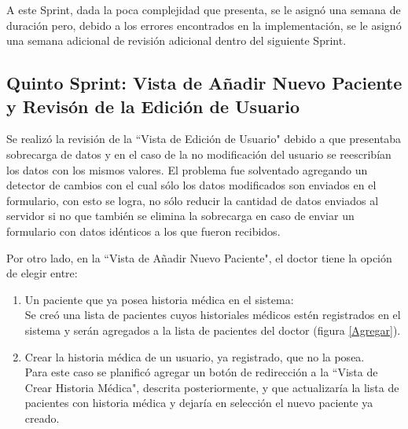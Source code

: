     A este Sprint, dada la poca complejidad que presenta, se le asignó una semana de duración pero, debido a los errores encontrados en la implementación, se le asignó una semana adicional de revisión adicional dentro del siguiente Sprint.
    
    \subsection{Quinto Sprint: Vista de Añadir Nuevo Paciente y Revisón de la Edición de Usuario}
    
    Se realizó la revisión de la ``Vista de Edición de Usuario" debido a que presentaba sobrecarga de datos y en el caso de la no modificación del usuario se reescribían los datos con los mismos valores. El problema fue solventado agregando un detector de cambios con el cual sólo los datos modificados son enviados en el formulario, con esto se logra, no sólo reducir la cantidad de datos enviados al servidor si no que también se elimina la sobrecarga en caso de enviar un formulario con datos idénticos a los que fueron recibidos.
    
    Por otro lado, en la ``Vista de Añadir Nuevo Paciente", el doctor tiene la opción de elegir entre:
    
    \begin{enumerate}
        \item\label{list} Un paciente que ya posea historia médica en el sistema:\\
        Se creó una lista de pacientes cuyos historiales médicos estén registrados en el sistema y serán agregados a la lista de pacientes del doctor (figura \ref{Agregar}).
        \item\label{new} Crear la historia médica de un usuario, ya registrado, que no la posea.\\
        Para este caso se planificó agregar un botón de redirección a la ``Vista de Crear Historia Médica", descrita posteriormente, y que actualizaría la lista de pacientes con historia médica y dejaría en selección el nuevo paciente ya creado.
    \end{enumerate}
    

